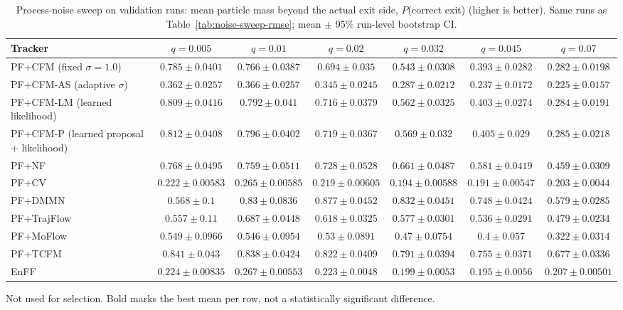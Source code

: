 \begin{table}[ht]
\centering
\small
\caption{Process-noise sweep on validation runs: mean particle mass beyond the actual exit side, $P$(correct exit) (higher is better). Same runs as Table~\ref{tab:noise-sweep-rmse}; mean $\pm$ 95\% run-level bootstrap CI.}
\label{tab:noise-sweep-pcorrect}
\begin{adjustbox}{max width=\linewidth}
\begin{tabular}{lcccccc}
\toprule
Tracker & $q{=}0.005$ & $q{=}0.01$ & $q{=}0.02$ & $q{=}0.032$ & $q{=}0.045$ & $q{=}0.07$ \\
\midrule
PF+CFM (fixed $\sigma{=}1.0$) & $\mathbf{0.785\pm0.0401}$ & $0.766\pm0.0387$ & $0.694\pm0.035$ & $0.543\pm0.0308$ & $0.393\pm0.0282$ & $0.282\pm0.0198$ \\
PF+CFM-AS (adaptive $\sigma$) & $0.362\pm0.0257$ & $\mathbf{0.366\pm0.0257}$ & $0.345\pm0.0245$ & $0.287\pm0.0212$ & $0.237\pm0.0172$ & $0.225\pm0.0157$ \\
PF+CFM-LM (learned likelihood) & $\mathbf{0.809\pm0.0416}$ & $0.792\pm0.041$ & $0.716\pm0.0379$ & $0.562\pm0.0325$ & $0.403\pm0.0274$ & $0.284\pm0.0191$ \\
PF+CFM-P (learned proposal + likelihood) & $\mathbf{0.812\pm0.0408}$ & $0.796\pm0.0402$ & $0.719\pm0.0367$ & $0.569\pm0.032$ & $0.405\pm0.029$ & $0.285\pm0.0218$ \\
PF+NF & $\mathbf{0.768\pm0.0495}$ & $0.759\pm0.0511$ & $0.728\pm0.0528$ & $0.661\pm0.0487$ & $0.581\pm0.0419$ & $0.459\pm0.0309$ \\
PF+CV & $0.222\pm0.00583$ & $\mathbf{0.265\pm0.00585}$ & $0.219\pm0.00605$ & $0.194\pm0.00588$ & $0.191\pm0.00547$ & $0.203\pm0.0044$ \\
PF+DMMN & $0.568\pm0.1$ & $0.83\pm0.0836$ & $\mathbf{0.877\pm0.0452}$ & $0.832\pm0.0451$ & $0.748\pm0.0424$ & $0.579\pm0.0285$ \\
\midrule
PF+TrajFlow & $0.557\pm0.11$ & $\mathbf{0.687\pm0.0448}$ & $0.618\pm0.0325$ & $0.577\pm0.0301$ & $0.536\pm0.0291$ & $0.479\pm0.0234$ \\
PF+MoFlow & $\mathbf{0.549\pm0.0966}$ & $0.546\pm0.0954$ & $0.53\pm0.0891$ & $0.47\pm0.0754$ & $0.4\pm0.057$ & $0.322\pm0.0314$ \\
PF+TCFM & $\mathbf{0.841\pm0.043}$ & $0.838\pm0.0424$ & $0.822\pm0.0409$ & $0.791\pm0.0394$ & $0.755\pm0.0371$ & $0.677\pm0.0336$ \\
EnFF & $0.224\pm0.00835$ & $\mathbf{0.267\pm0.00553}$ & $0.223\pm0.0048$ & $0.199\pm0.0053$ & $0.195\pm0.0056$ & $0.207\pm0.00501$ \\
\bottomrule
\end{tabular}
\end{adjustbox}
\par\smallskip\parbox{0.95\linewidth}{\footnotesize Not used for selection. Bold marks the best mean per row, not a statistically significant difference.}
\end{table}

